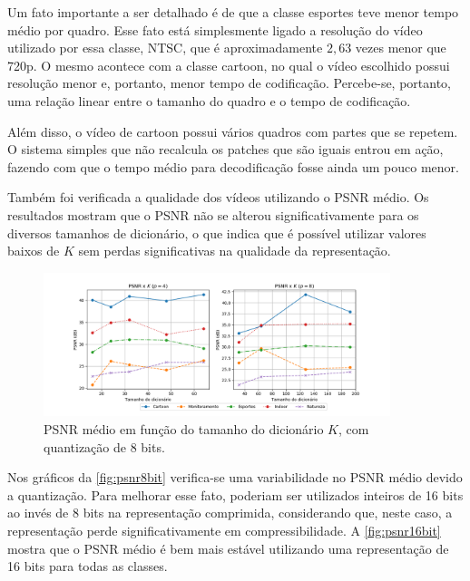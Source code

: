 \documentclass[cic,tc]{iiufrgs}
\begin{document}
Um fato importante a ser detalhado é de que a classe esportes teve menor tempo médio por quadro.
Esse fato está simplesmente ligado a resolução do vídeo utilizado por essa classe, NTSC, que é 
aproximadamente $2,63$ vezes menor que 720p.
O mesmo acontece com a classe cartoon, no qual o vídeo escolhido possui resolução menor e, portanto,
menor tempo de codificação.
Percebe-se, portanto, uma relação linear entre o tamanho do quadro e o tempo de codificação.

Além disso, o vídeo de cartoon possui vários quadros com partes que se repetem.
O sistema simples que não recalcula os patches que são iguais entrou em ação, fazendo com que 
o tempo médio para decodificação fosse ainda um pouco menor.

Também foi verificada a qualidade dos vídeos utilizando o PSNR médio. 
Os resultados mostram que o PSNR não se alterou significativamente para os diversos tamanhos
de dicionário, o que indica que é possível utilizar valores baixos de $K$ sem perdas significativas
na qualidade da representação.

\begin{figure}[H]
    \caption{PSNR médio em função do tamanho do dicionário $K$, com quantização de 8 bits.}
    \begin{center}
        \includegraphics[width=0.9\textwidth]{img/graficos/ds_psnr.png}
    \end{center}
    \label{fig:psnr8bit}
\end{figure}

Nos gráficos da \autoref{fig:psnr8bit} verifica-se uma variabilidade no PSNR médio devido 
a quantização.
Para melhorar esse fato, poderiam ser utilizados inteiros de 16 bits ao invés de 8 bits na 
representação comprimida, considerando que, neste caso, a representação perde significativamente em 
compressibilidade.
A \autoref{fig:psnr16bit} mostra que o PSNR médio é bem mais estável utilizando uma representação 
de 16 bits para todas as classes.
\end{document}
